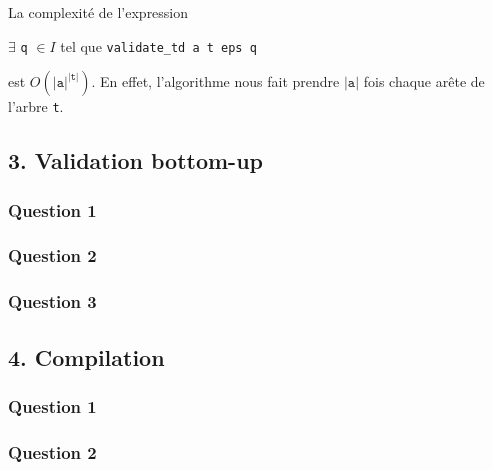 \documentclass[a4paper,12pt]{article}
\newcommand{\ocaml}[1]{\texttt{#1}}
\begin{document}
La complexité de l'expression

\centerline{
$\exists$ \ocaml{q} $\in I$ tel que \ocaml{validate_td a t eps q}
}

est $O(|\ocaml{a}|^{|\ocaml{t}|})$. En effet, l'algorithme
nous fait prendre $|\ocaml{a}|$ fois chaque arête de l'arbre \ocaml{t}.


\subsection*{3. Validation bottom-up}
\subsubsection*{Question 1}
\subsubsection*{Question 2}
\subsubsection*{Question 3}


\subsection*{4. Compilation}
\subsubsection*{Question 1}
\subsubsection*{Question 2}
\end{document}
